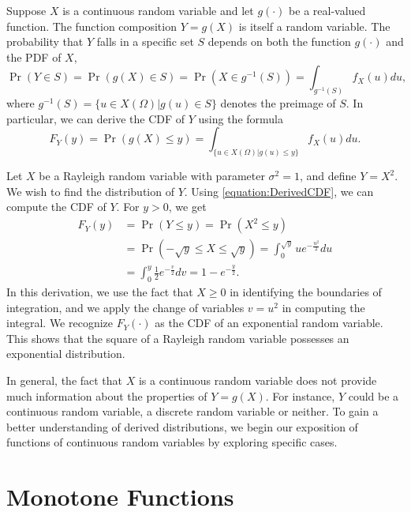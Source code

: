 Suppose $X$ is a continuous random variable and let $g(\cdot)$ be a real-valued function.
The function composition $Y = g(X)$ is itself a random variable.
The probability that $Y$ falls in a specific set $S$ depends on both the function $g(\cdot)$ and the PDF of $X$,
\begin{equation*}
\Pr (Y \in S) = \Pr (g(X) \in S) 
= \Pr \left( X \in g^{-1}(S) \right)
= \int_{g^{-1} (S)} f_X (u) du ,
\end{equation*}
where $g^{-1} (S) = \{ u \in X(\Omega) | g(u) \in S \}$ denotes the preimage of $S$.
In particular, we can derive the CDF of $Y$ using the formula
\begin{equation} \label{equation:DerivedCDF}
F_Y(y) = \Pr (g(X) \leq y)
= \int_{ \{ u \in X(\Omega) | g(u) \leq y \} } f_X(u) du .
\end{equation}

\begin{example} \label{example:RayleighExponentialRV}
Let $X$ be a Rayleigh  random variable with parameter $\sigma^2  = 1$, and define $Y = X^2$.
We wish to find the distribution of $Y$.
Using \eqref{equation:DerivedCDF}, we can compute the CDF of $Y$.
For $y > 0$, we get
\begin{equation*}
\begin{split}
F_Y(y) &= \Pr (Y \leq y) = \Pr \left( X^2 \leq y \right) \\
&= \Pr (- \sqrt{y} \leq X \leq \sqrt{y})
= \int_0^{\sqrt{y}} u e^{- \frac{u^2}{2}} du \\
&= \int_0^{y} \frac{1}{2} e^{- \frac{v}{2}} dv
= 1 - e^{-\frac{y}{2}} .
\end{split}
\end{equation*}
In this derivation, we use the fact that $X \geq 0$ in identifying the boundaries of integration, and we apply the change of variables $v = u^2$ in computing the integral.
We recognize $F_Y(\cdot)$ as the CDF of an exponential random variable.
This shows that the square of a Rayleigh random variable possesses an exponential distribution.
\end{example}

In general, the fact that $X$ is a continuous random variable does not provide much information about the properties of $Y = g(X)$.
For instance, $Y$ could be a continuous random variable, a discrete random variable or neither.
To gain a better understanding of derived distributions, we begin our exposition of functions of continuous random variables by exploring specific cases.


\section{Monotone Functions}

